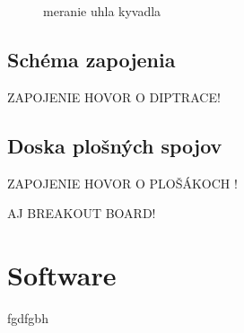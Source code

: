 \begin{figure}[!tbh]
\hfill
{}
\hfill
{}
\hfill
\caption{meranie uhla kyvadla}\label{OBRAZOK 2.2}
\end{figure}


\subsection{Schéma zapojenia}

ZAPOJENIE HOVOR O DIPTRACE!

\subsection{Doska plošných spojov}

ZAPOJENIE HOVOR O PLOŠÁKOCH !

AJ BREAKOUT BOARD!

\section{Software}
fgdfgbh 